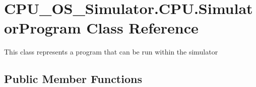 \hypertarget{class_c_p_u___o_s___simulator_1_1_c_p_u_1_1_simulator_program}{}\section{C\+P\+U\+\_\+\+O\+S\+\_\+\+Simulator.\+C\+P\+U.\+Simulator\+Program Class Reference}
\label{class_c_p_u___o_s___simulator_1_1_c_p_u_1_1_simulator_program}


This class represents a program that can be run within the simulator  


\subsection*{Public Member Functions}
